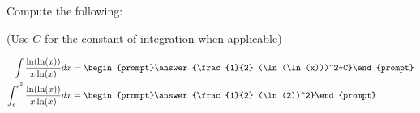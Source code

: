 \documentclass{ximera}
\author{Jim Talamo}
\begin{document}
\begin{exercise}
Compute the following:

\begin{prompt} (Use $C$ for the constant of integration when applicable) \end{prompt}

\begin{align*}
\int \frac{\ln(\ln(x))}{x\ln(x)} dx &=
\begin{prompt}\answer{\frac{1}{2} (\ln(\ln(x)))^2+C}\end{prompt} \\
\int_e^{e^2} \frac{\ln(\ln(x))}{x\ln(x)} dx &=\begin{prompt}\answer{\frac{1}{2} (\ln(2))^2}\end{prompt}
\end{align*}
\end{exercise}
\end{document}
